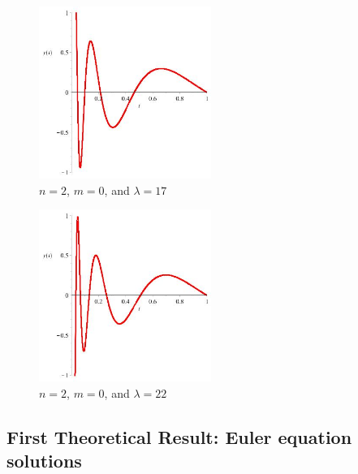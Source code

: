 \documentclass[executivepaper]{article}
\begin{document}
\begin{center}
\begin{figure}[H]

\centering

\includegraphics[width=0.5\textwidth]{NEquals2MEquals0LambdaEquals17}

\caption{$n=2$, $m=0$, and $\lambda=17$}

\end{figure}

\vspace{5mm}

\begin{figure}[H]

\centering

\includegraphics[width=0.5\textwidth]{NEquals2MEquals0LambdaEquals22}

\caption{$n=2$, $m=0$, and $\lambda=22$}

\end{figure}

\end{center}

\pagebreak

\vspace*{-40mm}

\subsection*{First Theoretical Result: Euler equation solutions}
\end{document}
